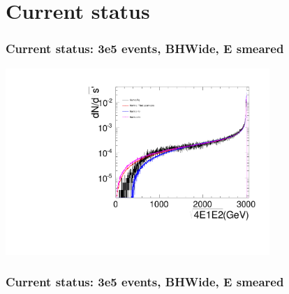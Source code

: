 \documentclass{beamer}
\begin{document}
\section{Current status}
\begin{frame}
\frametitle{Current status: 3e5 events, BHWide, E smeared}
\begin{center}
\includegraphics[width=10cm,page=1]{LumiAll.pdf}
\end{center}
\end{frame}
\begin{frame}
\frametitle{Current status: 3e5 events, BHWide, E smeared}
\end{frame}
\end{document}
